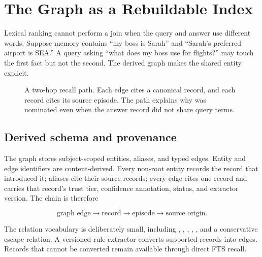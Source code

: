 \section{The Graph as a Rebuildable Index}
\label{sec:graph}

Lexical ranking cannot perform a join when the query and answer use different words. Suppose memory contains ``my boss is Sarah'' and ``Sarah's preferred airport is SEA.'' A query asking ``what does my boss use for flights?'' may touch the first fact but not the second. The derived graph makes the shared entity explicit.

\begin{figure}[t]
  \centering
  
  \caption{A two-hop recall path. Each edge cites a canonical record, and each record cites its source episode. The path explains why  was nominated even when the answer record did not share query terms.}
  \label{fig:graph-path}
\end{figure}


\subsection{Derived schema and provenance}

The graph stores subject-scoped entities, aliases, and typed edges. Entity and edge identifiers are content-derived. Every non-root entity records the record that introduced it; aliases cite their source records; every edge cites one record and carries that record's trust tier, confidence annotation, status, and extractor version. The chain is therefore

\begin{equation}
\text{graph edge}\rightarrow\text{record}\rightarrow\text{episode}\rightarrow\text{source origin}.
\end{equation}

The relation vocabulary is deliberately small, including , , , , , and a conservative  escape relation. A versioned rule extractor converts supported records into edges. Records that cannot be converted remain available through direct FTS recall.


